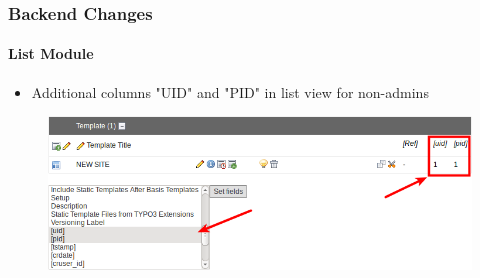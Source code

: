 
\begin{frame}[fragile]
	\frametitle{Backend Changes}
	\framesubtitle{List Module}

	\begin{itemize}
		\item Additional columns "UID" and "PID" in list view for non-admins
	\end{itemize}

	\begin{figure}
		\includegraphics[width=0.95\linewidth]{Images/BackendChanges/AdditionalColumnsInListModule.png}
	\end{figure}

\end{frame}



